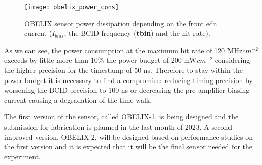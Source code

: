 \begin{figure}[h!]
\centering
\texttt{[image: obelix\_power\_cons]}
\caption{OBELIX sensor power dissipation depending on the front edn current (\textbf{$I_{bias}$}, the BCID frequency (\textbf{tbin}) and the hit rate).}
\label{fig:obelix_power_cons}
\end{figure}

As we can see, the power consumption at the maximum hit rate of 120 MHz$cm^{-2}$ exceeds by little more than 10\% the power budget of 200 mW$cm^{-2}$ considering the higher precision for the timestamp of 50 ns. Therefore to stay within the power budget it is necessary to find a compromise: reducing timing precision by worsening the BCID precision to 100 ns or decreasing the pre-amplifier biasing current causing a degradation of the time walk.


The first version of the sensor, called OBELIX-1, is being designed and the submission for fabrication is planned in the last month of 2023. A second improved version, OBELIX-2, will be designed based on performance studies on the first version and it is expected that it will be the final sensor needed for the experiment.

